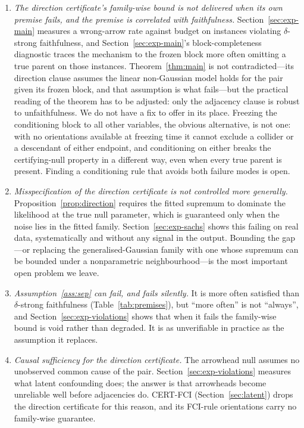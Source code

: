 \begin{enumerate}
\item \emph{The direction certificate's family-wise bound is not delivered
  when its own premise fails, and the premise is correlated with
  faithfulness.} Section~\ref{sec:exp-main} measures a wrong-arrow rate
  against budget on instances violating $\delta$-strong faithfulness, and
  Section~\ref{sec:exp-main}'s block-completeness diagnostic traces the
  mechanism to the frozen block more often omitting a true parent on those
  instances. Theorem~\ref{thm:main} is not contradicted---its direction
  clause assumes the linear non-Gaussian model holds for the pair given its
  frozen block, and that assumption is what fails---but the practical reading
  of the theorem has to be adjusted: only the adjacency clause is robust to
  unfaithfulness. We do not have a fix to offer in its place. Freezing the
  conditioning block to all other variables, the obvious alternative, is not
  one: with no orientations available at freezing time it cannot exclude a
  collider or a descendant of either endpoint, and conditioning on either
  breaks the certifying-null property in a different way, even when every
  true parent is present. Finding a conditioning rule that avoids both
  failure modes is open.

\item \emph{Misspecification of the direction certificate is not controlled
  more generally.} Proposition~\ref{prop:direction} requires the fitted
  supremum to dominate the likelihood at the true null parameter, which is
  guaranteed only when the noise lies in the fitted family.
  Section~\ref{sec:exp-sachs} shows this failing on real data,
  systematically and without any signal in the output. Bounding the gap---or
  replacing the generalised-Gaussian family with one whose supremum can be
  bounded under a nonparametric neighbourhood---is the most important open
  problem we leave.

\item \emph{Assumption~\ref{ass:sep} can fail, and fails silently.} It is more
  often satisfied than $\delta$-strong faithfulness
  (Table~\ref{tab:premises}), but ``more often'' is not ``always'', and
  Section~\ref{sec:exp-violations} shows that when it fails the family-wise
  bound is void rather than degraded. It is as unverifiable in practice as the
  assumption it replaces.

\item \emph{Causal sufficiency for the direction certificate.} The arrowhead
  null assumes no unobserved common cause of the pair.
  Section~\ref{sec:exp-violations} measures what latent confounding does; the
  answer is that arrowheads become unreliable well before adjacencies do.
  CERT-FCI (Section~\ref{sec:latent}) drops the direction certificate for this
  reason, and its FCI-rule orientations carry no family-wise guarantee.


\end{enumerate}
